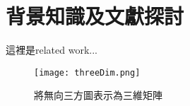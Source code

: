 \chapter{背景知識及文獻探討}
\label{chapter:relatedWork}
\par 這裡是related work...

\begin{figure}[h!]
    \centering
    \texttt{[image: threeDim.png]}
    \caption{將無向三方圖表示為三維矩陣}
    \label{fig:threeDim}
\end{figure}